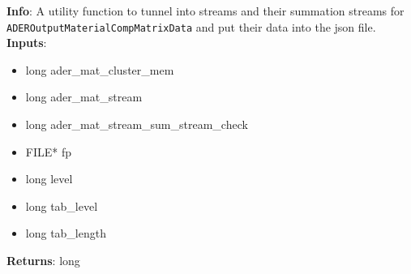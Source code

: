 \textbf{Info}: A utility function to tunnel into streams and their summation
streams for \texttt{ADEROutputMaterialCompMatrixData} and put their data
into the json file.\\

\noindent \textbf{Inputs}:
\begin{itemize}
\item{long ader\_mat\_cluster\_mem}
\item{long ader\_mat\_stream}
\item{long ader\_mat\_stream\_sum\_stream\_check}
\item{FILE* fp}
\item{long level}
\item{long tab\_level}
\item{long tab\_length}
\end{itemize}

\noindent \textbf{Returns}: long
